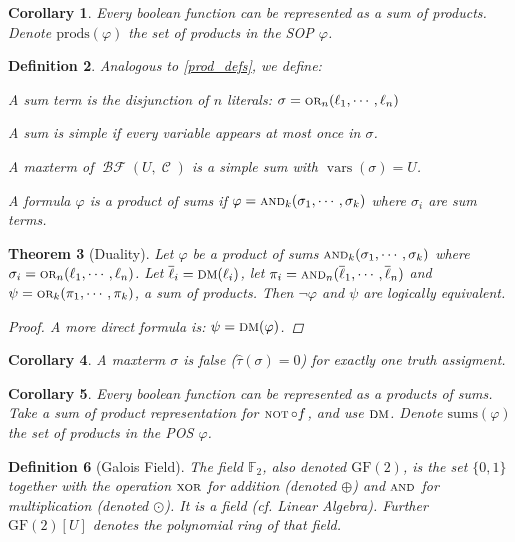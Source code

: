 \documentclass[12pt]{article}
\let\bar\overline
\newcommand{\scr}[1]{{\scriptstyle\textup{#1}}}
\newcommand{\scrf}[1]{{\scriptstyle\textup{\footnotesize #1}}}
\DeclareMathOperator{\C}{\mathcal{C}}
\DeclareMathOperator{\BF}{\mathcal{BF}}
\DeclareMathOperator{\NOT}{\scr{NOT}}
\DeclareMathOperator{\OR}{\scr{OR}}
\DeclareMathOperator{\AND}{\scr{AND}}
\DeclareMathOperator{\XOR}{\scr{XOR}}
\newcommand*{\B}{\{0,1\}}
\DeclareMathOperator{\vars}{vars}
\newtheorem{theorem}{Theorem}[subsection]
\newtheorem{definition}[theorem]{Definition}
\newtheorem{corollary}[theorem]{Corollary}
\begin{document}
\begin{corollary}
  Every boolean function can be represented as a sum of products. Denote $\text{prods}(\varphi)$ the set of products in the SOP $\varphi$.
\end{corollary}

\begin{definition}
  Analogous to \ref{prod_defs}, we define: 
  \begin{compactenum}[(i)]
    \item A sum term is the disjunction of $n$ literals: $\sigma=\OR_n(\ell_1,\cdots,\ell_n)$
    \item A sum is simple if every variable appears at most once in $\sigma$.
    \item A maxterm of $\BF(U,\C)$ is a simple sum with $\vars(\sigma)=U$.
    \item A formula $\varphi$ is a product of sums if $\varphi=\AND_k(\sigma_1,\cdots,\sigma_k)$ where $\sigma_i$ are sum terms.
  \end{compactenum}
\end{definition}

\begin{theorem}[Duality]
  Let $\varphi$ be a product of sums $\AND_k(\sigma_1,\cdots,\sigma_k)$ where $\sigma_i=\OR_n(\ell_1,\cdots,\ell_n)$. Let $\bar{\ell}_i=\scrf{DM}(\ell_i)$, let $\pi_i=\AND_n(\bar{\ell}_1,\cdots,\bar{\ell}_n)$ and $\psi=\OR_k(\pi_1,\cdots,\pi_k)$, a sum of products. Then $\neg\varphi$ and $\psi$ are logically equivalent.
  \begin{proof}
    A more direct formula is: $\psi=\scrf{DM}(\varphi)$.
  \end{proof}
\end{theorem}

\begin{corollary}
  A maxterm $\sigma$ is false ($\hat{\tau}(\sigma)=0$) for exactly one truth assigment.
\end{corollary}

\begin{corollary}
  Every boolean function can be represented as a products of sums. Take a sum of product representation for $\NOT\circ f$, and use $\scrf{DM}$. Denote $\text{sums}(\varphi)$ the set of products in the POS $\varphi$.
\end{corollary}

\begin{definition}[Galois Field]
  The field $\mathbb{F}_2$, also denoted $\text{GF}(2)$, is the set $\B$ together with the operation $\XOR$ for addition (denoted $\oplus$) and $\AND$ for multiplication (denoted $\odot$). It is a field (cf. Linear Algebra). Further $\text{GF}(2)[U]$ denotes the polynomial ring of that field.
\end{definition}
\end{document}

